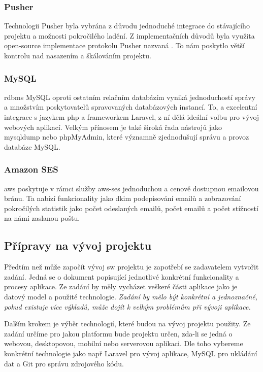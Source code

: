 \subsubsection{Pusher}

Technologii Pusher byla vybrána z důvodu jednoduché integrace do stávajícího projektu a možnosti pokročilého ladění. Z implementačních důvodů byla využita \gls{open-source} implementace protokolu Pusher nazvaná . To nám poskytlo větší kontrolu nad nasazením a škálováním projektu.

\subsubsection{MySQL}

\acrshort{rdbms} MySQL oproti ostatním relačním databázím vyniká jednoduchostí správy a množstvím poskytovatelů spravovaných databázových instancí\cite{mysql-vs-others}. To, a excelentní integrace s jazykem \acrshort{php} a \gls{framework}em Laravel, z ní dělá ideální volbu pro vývoj webových aplikací. Velkým přínosem je také široká řada nástrojů jako mysqldump\cite{mysqldump} nebo phpMyAdmin\cite{phpmyadmin}, které významně zjednodušují správu a provoz databáze MySQL.

\subsubsection{Amazon SES}

\acrfull{aws} poskytuje v rámci služby \acrfull{aws-ses} jednoduchou a cenově dostupnou emailovou bránu. Ta nabízí funkcionality jako \gls{dkim} podepisování emailů a zobrazování pokročilých statistik jako počet odeslaných emailů, počet  emailů\cite{email-bounce} a počet stížností na námi zaslanou poštu.

\subsection{Přípravy na vývoj projektu}

Předtím než může započít vývoj \acrshort{sw} projektu je zapotřebí se zadavatelem vytvořit zadání. Jedná se o dokument popisující jednotlivé konkrétní funkcionality a procesy aplikace. Ze zadání by měly vycházet veškeré části aplikace jako je datový model a použité technologie. \emph{Zadání by mělo být konkrétní a jednoznačné, pokud existuje více výkladů, může dojít k velkým problémům při vývoji aplikace.} 

Dalším krokem je výběr technologií, které budou na vývoj projektu použity. Ze zadání určíme pro jakou platformu bude projektu určen, zda-li se jedná o webovou, desktopovou, mobilní nebo serverovou aplikaci. Dle toho vybereme konkrétní technologie jako např Laravel\cite{laravel} pro vývoj aplikace, MySQL\cite{mysql} pro ukládání dat a Git\cite{git} pro správu zdrojového kódu.

